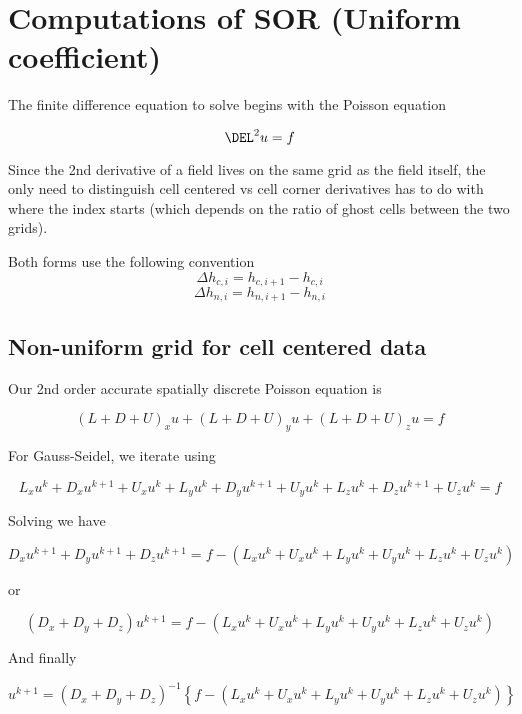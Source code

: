 \documentclass[11pt]{article}
\begin{document}
\doublespacing
\MOONSTITLE
\maketitle

\section{Computations of SOR (Uniform coefficient)}
The finite difference equation to solve begins with the Poisson equation


\begin{equation}
	\DEL^2 u = f
\end{equation}

Since the 2nd derivative of a field lives on the same grid as the field itself, the only need to distinguish cell centered vs cell corner derivatives has to do with where the index starts (which depends on the ratio of ghost cells between the two grids).

Both forms use the following convention
\begin{equation}
	\Delta h_{c,i} = h_{c,i+1} - h_{c,i}
\end{equation}
\begin{equation}
	\Delta h_{n,i} = h_{n,i+1} - h_{n,i}
\end{equation}

\subsection{Non-uniform grid for cell centered data}
Our 2nd order accurate spatially discrete Poisson equation is

\begin{equation}
	(L + D + U)_x u +
	(L + D + U)_y u +
	(L + D + U)_z u
	 = f
\end{equation}

For Gauss-Seidel, we iterate using

\begin{equation}
	L_x u^{k} + D_x u^{k+1} + U_x u^{k} +
	L_y u^{k} + D_y u^{k+1} + U_y u^{k} +
	L_z u^{k} + D_z u^{k+1} + U_z u^{k}
	 = f
\end{equation}

Solving we have

\begin{equation}
	D_x u^{k+1} +
	D_y u^{k+1} +
	D_z u^{k+1}
	 = f - (
	L_x u^{k} + U_x u^{k} +
	L_y u^{k} + U_y u^{k} +
	L_z u^{k} + U_z u^{k}
	)
\end{equation}

or

\begin{equation}
	(D_x + D_y + D_z) u^{k+1}
	 = f - (
	L_x u^{k} + U_x u^{k} +
	L_y u^{k} + U_y u^{k} +
	L_z u^{k} + U_z u^{k}
	)
\end{equation}

And finally

\begin{equation}
	u^{k+1}
	 =
	(D_x + D_y + D_z)^{-1}
	\left\{
	f - (
	L_x u^{k} + U_x u^{k} +
	L_y u^{k} + U_y u^{k} +
	L_z u^{k} + U_z u^{k}
	) \right\}
\end{equation}
\end{document}
